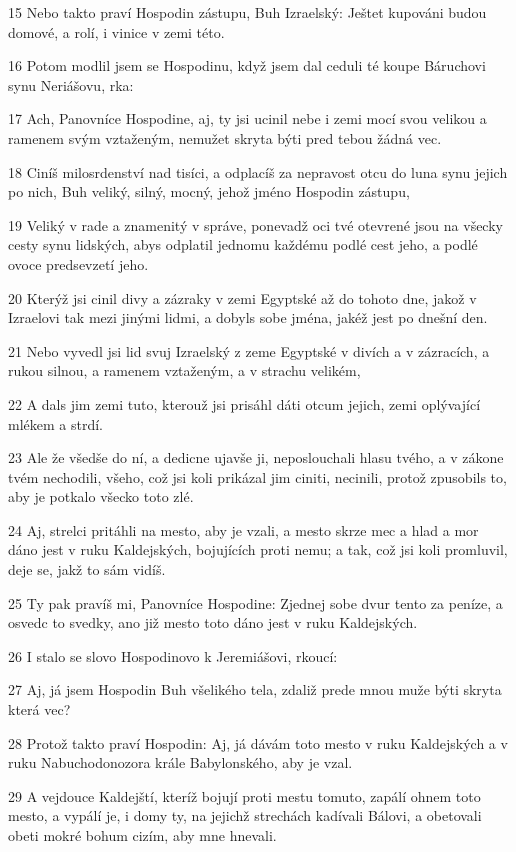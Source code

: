 \par 15 Nebo takto praví Hospodin zástupu, Buh Izraelský: Ještet kupováni budou domové, a rolí, i vinice v zemi této.
\par 16 Potom modlil jsem se Hospodinu, když jsem dal ceduli té koupe Báruchovi synu Neriášovu, rka:
\par 17 Ach, Panovníce Hospodine, aj, ty jsi ucinil nebe i zemi mocí svou velikou a ramenem svým vztaženým, nemužet skryta býti pred tebou žádná vec.
\par 18 Ciníš milosrdenství nad tisíci, a odplacíš za nepravost otcu do luna synu jejich po nich, Buh veliký, silný, mocný, jehož jméno Hospodin zástupu,
\par 19 Veliký v rade a znamenitý v správe, ponevadž oci tvé otevrené jsou na všecky cesty synu lidských, abys odplatil jednomu každému podlé cest jeho, a podlé ovoce predsevzetí jeho.
\par 20 Kterýž jsi cinil divy a zázraky v zemi Egyptské až do tohoto dne, jakož v Izraelovi tak mezi jinými lidmi, a dobyls sobe jména, jakéž jest po dnešní den.
\par 21 Nebo vyvedl jsi lid svuj Izraelský z zeme Egyptské v divích a v zázracích, a rukou silnou, a ramenem vztaženým, a v strachu velikém,
\par 22 A dals jim zemi tuto, kterouž jsi prisáhl dáti otcum jejich, zemi oplývající mlékem a strdí.
\par 23 Ale že všedše do ní, a dedicne ujavše ji, neposlouchali hlasu tvého, a v zákone tvém nechodili, všeho, což jsi koli prikázal jim ciniti, necinili, protož zpusobils to, aby je potkalo všecko toto zlé.
\par 24 Aj, strelci pritáhli na mesto, aby je vzali, a mesto skrze mec a hlad a mor dáno jest v ruku Kaldejských, bojujících proti nemu; a tak, což jsi koli promluvil, deje se, jakž to sám vidíš.
\par 25 Ty pak pravíš mi, Panovníce Hospodine: Zjednej sobe dvur tento za peníze, a osvedc to svedky, ano již mesto toto dáno jest v ruku Kaldejských.
\par 26 I stalo se slovo Hospodinovo k Jeremiášovi, rkoucí:
\par 27 Aj, já jsem Hospodin Buh všelikého tela, zdaliž prede mnou muže býti skryta která vec?
\par 28 Protož takto praví Hospodin: Aj, já dávám toto mesto v ruku Kaldejských a v ruku Nabuchodonozora krále Babylonského, aby je vzal.
\par 29 A vejdouce Kaldejští, kteríž bojují proti mestu tomuto, zapálí ohnem toto mesto, a vypálí je, i domy ty, na jejichž strechách kadívali Bálovi, a obetovali obeti mokré bohum cizím, aby mne hnevali.
